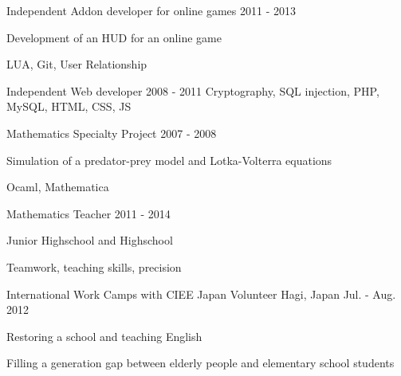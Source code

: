 \begin{cventries}
  \cventrysix
    {} %
    {Independent Addon developer for online games} %
    {} %
    {2011 - 2013} %
    {
      \begin{cvitems} %
        \item {Development of an HUD for an online game}
      \end{cvitems}
    }%
    {LUA, Git, User Relationship}


  \cventryskill
    {} %
    {Independent Web developer} %
    {} %
    {2008 - 2011} %
    {Cryptography, SQL injection, PHP, MySQL, HTML, CSS, JS}


  \cventrysix
    {} %
    {Mathematics Specialty Project} %
    {} %
    {2007 - 2008} %
    {
      \begin{cvitems} %
        \item {Simulation of a predator-prey model and Lotka-Volterra equations}
      \end{cvitems}
    }%
    {Ocaml, Mathematica}


  \cventrysix
    {} %
    {Mathematics Teacher} %
    {} %
    {2011 - 2014} %
    {
      \begin{cvitems} %
        \item {Junior Highschool and Highschool}
      \end{cvitems}
    }%
    {Teamwork, teaching skills, precision}


  \cventry
    {International Work Camps with CIEE Japan} %
    {Volunteer} %
    {Hagi, Japan} %
    {Jul. - Aug. 2012} %
    {
      \begin{cvitems} %
        \item {Restoring a school and teaching English}
        \item {Filling a generation gap between elderly people and elementary school students}
      \end{cvitems}
    }%

\end{cventries}
